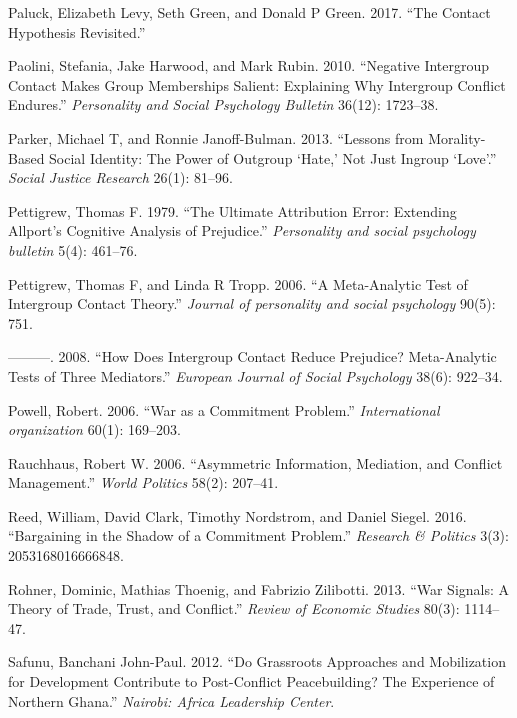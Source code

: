 \documentclass[11pt]{article}
\begin{document}
\leavevmode\hypertarget{ref-paluck2017contact}{}%
Paluck, Elizabeth Levy, Seth Green, and Donald P Green. 2017. ``The
Contact Hypothesis Revisited.''

\leavevmode\hypertarget{ref-paolini2010negative}{}%
Paolini, Stefania, Jake Harwood, and Mark Rubin. 2010. ``Negative
Intergroup Contact Makes Group Memberships Salient: Explaining Why
Intergroup Conflict Endures.'' \emph{Personality and Social Psychology
Bulletin} 36(12): 1723--38.

\leavevmode\hypertarget{ref-parker2013lessons}{}%
Parker, Michael T, and Ronnie Janoff-Bulman. 2013. ``Lessons from
Morality-Based Social Identity: The Power of Outgroup `Hate,' Not Just
Ingroup `Love'.'' \emph{Social Justice Research} 26(1): 81--96.

\leavevmode\hypertarget{ref-pettigrew1979ultimate}{}%
Pettigrew, Thomas F. 1979. ``The Ultimate Attribution Error: Extending
Allport's Cognitive Analysis of Prejudice.'' \emph{Personality and
social psychology bulletin} 5(4): 461--76.

\leavevmode\hypertarget{ref-pettigrew2006meta}{}%
Pettigrew, Thomas F, and Linda R Tropp. 2006. ``A Meta-Analytic Test of
Intergroup Contact Theory.'' \emph{Journal of personality and social
psychology} 90(5): 751.

\leavevmode\hypertarget{ref-pettigrew2008does}{}%
---------. 2008. ``How Does Intergroup Contact Reduce Prejudice?
Meta-Analytic Tests of Three Mediators.'' \emph{European Journal of
Social Psychology} 38(6): 922--34.

\leavevmode\hypertarget{ref-powell2006war}{}%
Powell, Robert. 2006. ``War as a Commitment Problem.''
\emph{International organization} 60(1): 169--203.

\leavevmode\hypertarget{ref-rauchhaus2006mediation}{}%
Rauchhaus, Robert W. 2006. ``Asymmetric Information, Mediation, and
Conflict Management.'' \emph{World Politics} 58(2): 207--41.

\leavevmode\hypertarget{ref-reed2016bargaining}{}%
Reed, William, David Clark, Timothy Nordstrom, and Daniel Siegel. 2016.
``Bargaining in the Shadow of a Commitment Problem.'' \emph{Research \&
Politics} 3(3): 2053168016666848.

\leavevmode\hypertarget{ref-rohner2013war}{}%
Rohner, Dominic, Mathias Thoenig, and Fabrizio Zilibotti. 2013. ``War
Signals: A Theory of Trade, Trust, and Conflict.'' \emph{Review of
Economic Studies} 80(3): 1114--47.

\leavevmode\hypertarget{ref-safunu2012grassroots}{}%
Safunu, Banchani John-Paul. 2012. ``Do Grassroots Approaches and
Mobilization for Development Contribute to Post-Conflict Peacebuilding?
The Experience of Northern Ghana.'' \emph{Nairobi: Africa Leadership
Center}.
\end{document}
